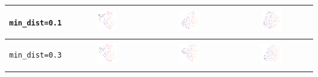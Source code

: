 \begin{tabular}{c|c|c|c}
	\begin{sideways} \verb|min_dist=0.1| \end{sideways} & \includegraphics*[width = 0.27\textwidth]{min=0,1,n=10.png} & \includegraphics*[width = 0.27\textwidth]{min=0,1,n=50.png} & \includegraphics*[width = 0.27\textwidth]{min=0,1,n=100.png}\\
	\hline
	\begin{sideways} \verb|min_dist=0.3| \end{sideways} & \includegraphics*[width = 0.27\textwidth]{min=0,3,n=10.png} & \includegraphics*[width = 0.27\textwidth]{min=0,3,n=50.png} & \includegraphics*[width = 0.27\textwidth]{min=0,3,n=100.png}\\

\end{tabular}
